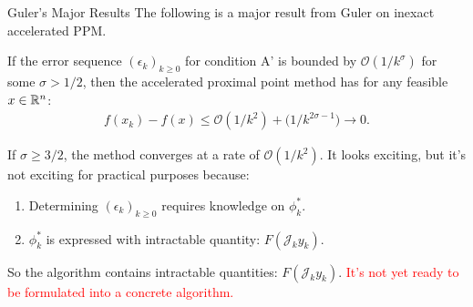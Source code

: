 \documentclass[11pt]{beamer}
\begin{document}
        \begin{frame}{Guler's Major Results}
            The following is a major result from Guler \cite{guler_new_1992} on inexact accelerated PPM. 
            \begin{theorem}
                If the error sequence $(\epsilon_k)_{k \ge0}$ for condition A' is bounded by $\mathcal O(1/k^\sigma)$ for some $\sigma > 1/2$, then the accelerated proximal point method has for any feasible $x \in \mathbb R^n$: 
                \begin{align*}
                    f(x_k) - f(x) \le \mathcal O(1/k^2) + \mathcal (1 / k^{2\sigma - 1}) \rightarrow 0. 
                \end{align*}    
            \end{theorem}
            If $\sigma \ge 3/2$, the method converges at a rate of $\mathcal O(1/k^2)$. 
            \pause 
            It looks exciting, but it's not exciting for practical purposes because: 
            \begin{enumerate}
                \item Determining $(\epsilon_k)_{k\ge 0}$ requires knowledge on $\phi_k^*$. 
                \item $\phi_k^*$ is expressed with intractable quantity: $F(\mathcal J_k y_k)$. 
            \end{enumerate}
            So the algorithm contains intractable quantities: $F(\mathcal J_k y_k)$. 
            \textcolor{red}{It's not yet ready to be formulated into a concrete algorithm.}
        \end{frame}
\end{document}

